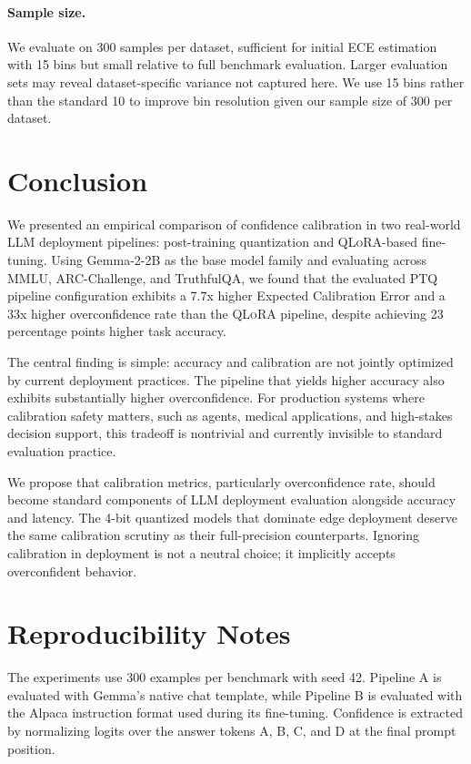 \documentclass[10pt]{article}
\newcommand{\ptq}{\textsc{PTQ}}
\newcommand{\qlora}{\textsc{QLoRA}}
\newcommand{\ece}{\textsc{ECE}}
\begin{document}
\paragraph{Sample size.}
We evaluate on 300 samples per dataset, sufficient for initial \ece{} estimation with 15 bins but small relative to full benchmark evaluation. Larger evaluation sets may reveal dataset-specific variance not captured here. We use 15 bins rather than the standard 10 to improve bin resolution given our sample size of 300 per dataset.

\section{Conclusion}

We presented an empirical comparison of confidence calibration in two real-world LLM deployment pipelines: post-training quantization and \qlora-based fine-tuning. Using Gemma-2-2B as the base model family and evaluating across MMLU, ARC-Challenge, and TruthfulQA, we found that the evaluated \ptq{} pipeline configuration exhibits a 7.7x higher Expected Calibration Error and a 33x higher overconfidence rate than the \qlora{} pipeline, despite achieving 23 percentage points higher task accuracy.

The central finding is simple: accuracy and calibration are not jointly optimized by current deployment practices. The pipeline that yields higher accuracy also exhibits substantially higher overconfidence. For production systems where calibration safety matters, such as agents, medical applications, and high-stakes decision support, this tradeoff is nontrivial and currently invisible to standard evaluation practice.

We propose that calibration metrics, particularly overconfidence rate, should become standard components of LLM deployment evaluation alongside accuracy and latency. The 4-bit quantized models that dominate edge deployment deserve the same calibration scrutiny as their full-precision counterparts. Ignoring calibration in deployment is not a neutral choice; it implicitly accepts overconfident behavior.




\appendix
\section{Reproducibility Notes}

The experiments use 300 examples per benchmark with seed 42. Pipeline A is evaluated with Gemma's native chat template, while Pipeline B is evaluated with the Alpaca instruction format used during its fine-tuning. Confidence is extracted by normalizing logits over the answer tokens A, B, C, and D at the final prompt position.
\end{document}
